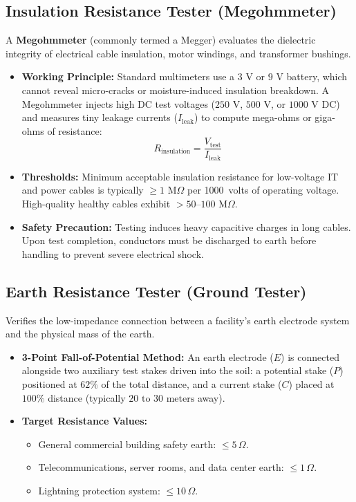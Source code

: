 \subsection{Insulation Resistance Tester (Megohmmeter)}
A \textbf{Megohmmeter} (commonly termed a Megger) evaluates the dielectric integrity of electrical cable insulation, motor windings, and transformer bushings.
\begin{itemize}[leftmargin=*]
    \item \textbf{Working Principle:} Standard multimeters use a $3\text{ V}$ or $9\text{ V}$ battery, which cannot reveal micro-cracks or moisture-induced insulation breakdown. A Megohmmeter injects high DC test voltages ($250\text{ V}$, $500\text{ V}$, or $1000\text{ V DC}$) and measures tiny leakage currents ($I_{\text{leak}}$) to compute mega-ohms or giga-ohms of resistance:
    \[
    R_{\text{insulation}} = \frac{V_{\text{test}}}{I_{\text{leak}}}
    \]
    \item \textbf{Thresholds:} Minimum acceptable insulation resistance for low-voltage IT and power cables is typically $\ge 1\text{ M}\Omega$ per 1000~volts of operating voltage. High-quality healthy cables exhibit $>50\text{--}100\text{ M}\Omega$.
    \item \textbf{Safety Precaution:} Testing induces heavy capacitive charges in long cables. Upon test completion, conductors must be discharged to earth before handling to prevent severe electrical shock.
\end{itemize}

\subsection{Earth Resistance Tester (Ground Tester)}
Verifies the low-impedance connection between a facility's earth electrode system and the physical mass of the earth.
\begin{itemize}[leftmargin=*]
    \item \textbf{3-Point Fall-of-Potential Method:} An earth electrode ($E$) is connected alongside two auxiliary test stakes driven into the soil: a potential stake ($P$) positioned at $62\%$ of the total distance, and a current stake ($C$) placed at $100\%$ distance (typically $20\text{ to }30\text{ meters}$ away).
    \item \textbf{Target Resistance Values:}
    \begin{itemize}
        \item General commercial building safety earth: $\le 5\,\Omega$.
        \item Telecommunications, server rooms, and data center earth: $\le 1\,\Omega$.
        \item Lightning protection system: $\le 10\,\Omega$.
    \end{itemize}
\end{itemize}


